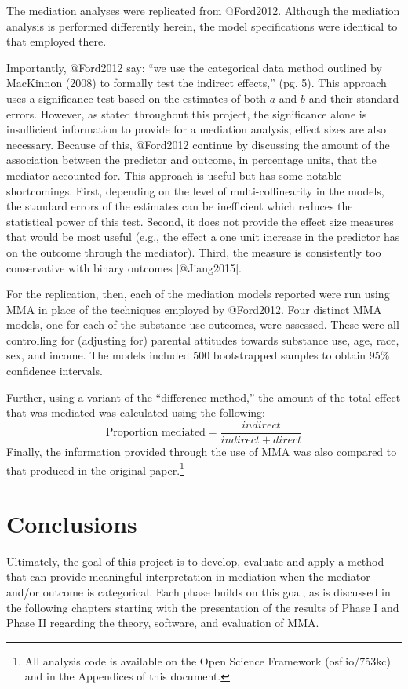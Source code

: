 \documentclass[]{article}
\let\rmarkdownfootnote\footnote%
\def\footnote{\protect\rmarkdownfootnote}
\begin{document}
The mediation analyses were replicated from @Ford2012. Although the
mediation analysis is performed differently herein, the model
specifications were identical to that employed there.

Importantly, @Ford2012 say: ``we use the categorical data method
outlined by MacKinnon (2008) to formally test the indirect effects,''
(pg. 5). This approach uses a significance test based on the estimates
of both \(a\) and \(b\) and their standard errors. However, as stated
throughout this project, the significance alone is insufficient
information to provide for a mediation analysis; effect sizes are also
necessary. Because of this, @Ford2012 continue by discussing the amount
of the association between the predictor and outcome, in percentage
units, that the mediator accounted for. This approach is useful but has
some notable shortcomings. First, depending on the level of
multi-collinearity in the models, the standard errors of the estimates
can be inefficient which reduces the statistical power of this test.
Second, it does not provide the effect size measures that would be most
useful (e.g., the effect a one unit increase in the predictor has on the
outcome through the mediator). Third, the measure is consistently too
conservative with binary outcomes {[}@Jiang2015{]}.

For the replication, then, each of the mediation models reported were
run using MMA in place of the techniques employed by @Ford2012. Four
distinct MMA models, one for each of the substance use outcomes, were
assessed. These were all controlling for (adjusting for) parental
attitudes towards substance use, age, race, sex, and income. The models
included 500 bootstrapped samples to obtain 95\% confidence intervals.

Further, using a variant of the ``difference method,'' the amount of the
total effect that was mediated was calculated using the following: \[
\text{Proportion mediated} =\frac{indirect}{indirect + direct}
\] \noindent Finally, the information provided through the use of MMA
was also compared to that produced in the original
paper.\footnote{All analysis code is available on the Open Science Framework (osf.io/753kc) and in the Appendices of this document.}

\section{Conclusions}\label{conclusions}

Ultimately, the goal of this project is to develop, evaluate and apply a
method that can provide meaningful interpretation in mediation when the
mediator and/or outcome is categorical. Each phase builds on this goal,
as is discussed in the following chapters starting with the presentation
of the results of Phase I and Phase II regarding the theory, software,
and evaluation of MMA.

\singlespacing
\end{document}
